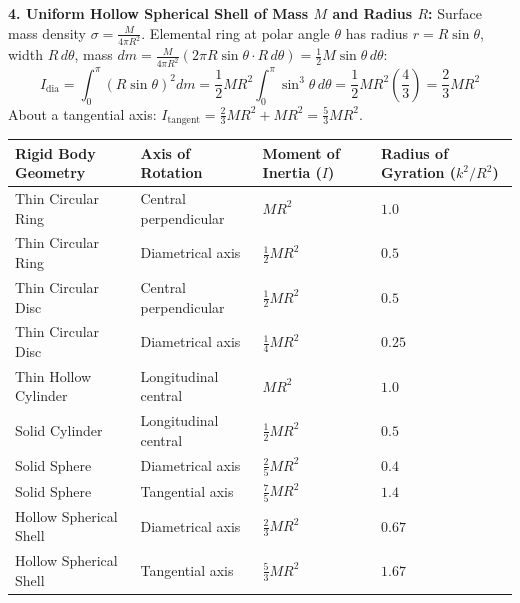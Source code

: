 \documentclass[10pt,a4paper]{article}
\begin{document}
\begin{formulabox}
\textbf{4. Uniform Hollow Spherical Shell of Mass $M$ and Radius $R$:}
Surface mass density $\sigma = \frac{M}{4\pi R^2}$. Elemental ring at polar angle $\theta$ has radius $r = R\sin\theta$, width $R\,d\theta$, mass $dm = \frac{M}{4\pi R^2}(2\pi R\sin\theta \cdot R\,d\theta) = \frac{1}{2}M\sin\theta\,d\theta$:
\begin{equation}
  I_{\text{dia}} = \int_0^\pi (R\sin\theta)^2 dm = \frac{1}{2}MR^2\int_0^\pi \sin^3\theta\,d\theta = \frac{1}{2}MR^2\left(\frac{4}{3}\right) = \frac{2}{3}MR^2
\end{equation}
About a tangential axis: $I_{\text{tangent}} = \frac{2}{3}MR^2 + MR^2 = \frac{5}{3}MR^2$.
\end{formulabox}

\begin{usecasebox}
\begin{center}
\begin{tabularx}{\linewidth}{|L|L|Y|Y|}
\toprule
\textbf{Rigid Body Geometry} & \textbf{Axis of Rotation} & \textbf{Moment of Inertia ($I$)} & \textbf{Radius of Gyration ($k^2/R^2$)} \\
\midrule
Thin Circular Ring & Central perpendicular & $MR^2$ & $1.0$ \\
Thin Circular Ring & Diametrical axis & $\frac{1}{2}MR^2$ & $0.5$ \\
Thin Circular Disc & Central perpendicular & $\frac{1}{2}MR^2$ & $0.5$ \\
Thin Circular Disc & Diametrical axis & $\frac{1}{4}MR^2$ & $0.25$ \\
Thin Hollow Cylinder & Longitudinal central & $MR^2$ & $1.0$ \\
Solid Cylinder & Longitudinal central & $\frac{1}{2}MR^2$ & $0.5$ \\
Solid Sphere & Diametrical axis & $\frac{2}{5}MR^2$ & $0.4$ \\
Solid Sphere & Tangential axis & $\frac{7}{5}MR^2$ & $1.4$ \\
Hollow Spherical Shell & Diametrical axis & $\frac{2}{3}MR^2$ & $0.67$ \\
Hollow Spherical Shell & Tangential axis & $\frac{5}{3}MR^2$ & $1.67$ \\
\bottomrule
\end{tabularx}
\end{center}
\end{usecasebox}

\end{document}
